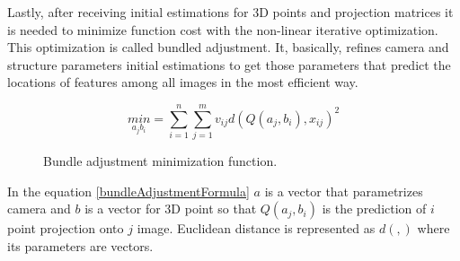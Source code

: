 \documentclass[../../../../main]{subfiles}
\begin{document}
Lastly, after receiving initial estimations for 3D points and projection matrices it is needed to minimize function cost with the non-linear iterative optimization. This optimization is called bundled adjustment. It, basically, refines camera and structure parameters initial estimations to get those parameters that predict the locations of features among all images in the most efficient way.

\begin{figure} [!ht]
  \centering    
    \begin{equation}
        \underset{a_j b_i}{min} = \sum_{i=1}^{n} \sum_{j=1}^{m} v_{i j} d(Q(a_j, b_i), x_{i j})^2
        \label{bundleAdjustmentFormula}
    \end{equation}
  \caption{Bundle adjustment minimization function.}
\end{figure}

In the equation \ref{bundleAdjustmentFormula} $a$ is a vector that parametrizes camera and $b$ is a vector for 3D point so that $Q(a_j, b_i)$ is the prediction of $i$ point projection onto $j$ image. Euclidean distance is represented as $d(,)$ where its parameters are vectors.
\end{document}
